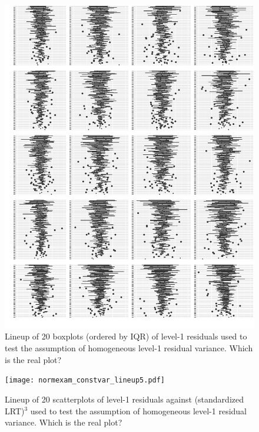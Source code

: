 \documentclass{article} %
\begin{document}
\begin{figure}
	\centering
	\includegraphics[width=\textwidth]{ahd_goodcyclone13.pdf}
	\caption{\label{fig:goodcyclone} Lineup of 20 boxplots (ordered by IQR) of level-1 residuals used to test the assumption of homogeneous level-1 residual variance.  Which is the real plot?}
\end{figure}

\begin{figure}
	\centering
	\texttt{[image: normexam\_constvar\_lineup5.pdf]}
	\caption{\label{fig:constvar1} Lineup of 20 scatterplots of level-1 residuals against (standardized LRT)$^3$ used to test the assumption of homogeneous level-1 residual variance.  Which is the real plot?}
\end{figure}


\end{document}
